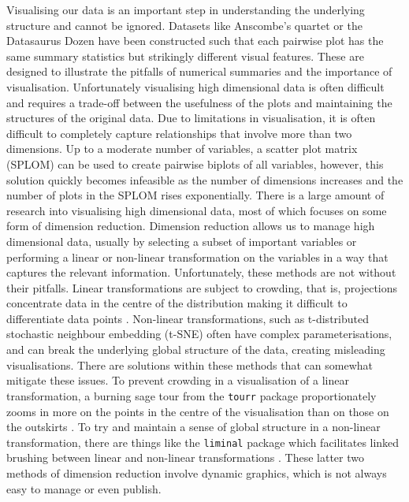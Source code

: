 Visualising our data is an important step in understanding the underlying structure and cannot be ignored. Datasets like Anscombe's quartet \citep{anscombe} or the Datasaurus Dozen \citep{datasaurpkg} have been constructed such that each pairwise plot has the same summary statistics but strikingly different visual features. These are designed to illustrate the pitfalls of numerical summaries and the importance of visualisation. Unfortunately visualising high dimensional data is often difficult and requires a trade-off between the usefulness of the plots and maintaining the structures of the original data. Due to limitations in visualisation, it is often difficult to completely capture relationships that involve more than two dimensions. Up to a moderate number of variables, a scatter plot matrix (SPLOM) can be used to create pairwise biplots of all variables, however, this solution quickly becomes infeasible as the number of dimensions increases and the number of plots in the SPLOM rises exponentially. There is a large amount of research into visualising high dimensional data, most of which focuses on some form of dimension reduction.
Dimension reduction allows us to manage high dimensional data, usually by selecting a subset of important variables or performing a linear or non-linear transformation on the variables in a way that captures the relevant information. Unfortunately, these methods are not without their pitfalls. Linear transformations are subject to crowding, that is, projections concentrate data in the centre of the distribution making it difficult to differentiate data points \citep{crowding}. Non-linear transformations, such as t-distributed stochastic neighbour embedding (t-SNE) \citep{tsne} often have complex parameterisations, and can break the underlying global structure of the data, creating misleading visualisations. There are solutions within these methods that can somewhat mitigate these issues. To prevent crowding in a visualisation of a linear transformation, a burning sage tour from the \texttt{tourr} package proportionately zooms in more on the points in the centre of the visualisation than on those on the outskirts \citep{burningsage}. To try and maintain a sense of global structure in a non-linear transformation, there are things like the \texttt{liminal} package which facilitates linked brushing between linear and non-linear transformations \citep{liminal}. These latter two methods of dimension reduction involve dynamic graphics, which is not always easy to manage or even publish.

